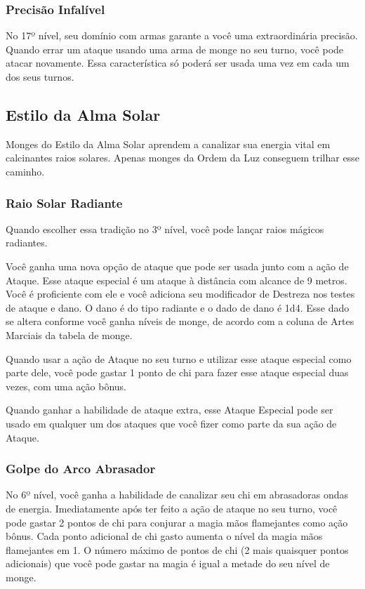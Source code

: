 \begin{multicols}{2}
\subsubsection*{Precisão Infalível}%
\label{ssub:precisao_infalivel}

No 17º nível, seu domínio com armas garante a você uma extraordinária precisão.
Quando errar um ataque usando uma arma de monge no seu turno, você pode atacar
novamente. Essa característica só poderá ser usada uma vez em cada um dos seus
turnos.

\subsection*{Estilo da Alma Solar}%
\label{sub:estilo_da_alma_solar}

Monges do Estilo da Alma Solar aprendem a canalizar sua energia vital em
calcinantes raios solares. Apenas monges da Ordem da Luz conseguem trilhar esse
caminho.

\subsubsection{Raio Solar Radiante}%
\label{ssub:raio_solar_radiante}

Quando escolher essa tradição no 3º nível, você pode lançar raios mágicos
radiantes.

Você ganha uma nova opção de ataque que pode ser usada junto com a ação de
Ataque. Esse ataque especial é um ataque à distância com alcance de 9 metros.
Você é proficiente com ele e você adiciona seu modificador de Destreza nos
testes de ataque e dano. O dano é do tipo radiante e o dado de dano é 1d4. Esse
dado se altera conforme você ganha níveis de monge, de acordo com a coluna de
Artes Marciais da tabela de monge.

Quando usar a ação de Ataque no seu turno e utilizar esse ataque especial como
parte dele, você pode gastar 1 ponto de chi para fazer esse ataque especial duas
vezes, com uma ação bônus.

Quando ganhar a habilidade de ataque extra, esse Ataque Especial pode ser usado
em qualquer um dos ataques que você fizer como parte da sua ação de Ataque.

\subsubsection*{Golpe do Arco Abrasador}%
\label{ssub:golpe_do_arco_abrasador}

No 6º nível, você ganha a habilidade de canalizar seu chi em abrasadoras ondas
de energia. Imediatamente após ter feito a ação de ataque no seu turno, você
pode gastar 2 pontos de chi para conjurar a magia mãos flamejantes como ação
bônus. Cada ponto adicional de chi gasto aumenta o nível da magia mãos
flamejantes em 1. O número máximo de pontos de chi (2 mais quaisquer pontos
adicionais) que você pode gastar na magia é igual a metade do seu nível de
monge.


\end{multicols}
